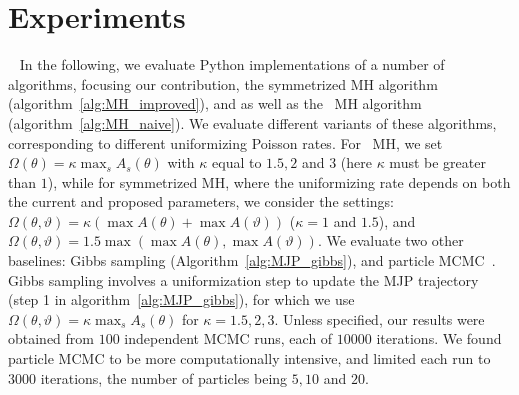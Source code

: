 \section{Experiments}\label{sec:expts}~
In the following, we evaluate Python implementations of a number of algorithms, focusing our contribution, the symmetrized MH algorithm (algorithm~\ref{alg:MH_improved}), and as well as the \naive\ MH algorithm (algorithm~\ref{alg:MH_naive}).
We evaluate different variants of these algorithms, corresponding to different uniformizing Poisson rates. %
For \naive\ MH, we set $\Omega(\theta) = \kappa \max_s A_s(\theta) $ with $\kappa$  equal to $1.5, 2$ and $3$ (here $\kappa$ must be greater than $1$), 
while for symmetrized MH, where the uniformizing rate depends on both the current and proposed parameters, we consider the settings:
 $\Omega(\theta, \vartheta) = \kappa (\max A(\theta) + \max A(\vartheta))$ 
 ($\kappa = 1$ and $1.5$), and 
$\Omega(\theta, \vartheta) = 1.5 \max(\max A(\theta), \max A(\vartheta))$.
We evaluate two other baselines: Gibbs sampling (Algorithm~\ref{alg:MJP_gibbs}), %
and particle MCMC~\citep[][see also section~\ref{sec:pmcmc} in the appendix]{Andrieu10}. 
Gibbs sampling involves a uniformization step to update the MJP trajectory (step 1 in algorithm~\ref{alg:MJP_gibbs}), for which we use $\Omega(\theta,\vartheta) = \kappa \max_s A_s(\theta)$ for $\kappa=1.5,2,3$. 
Unless specified, our results were obtained from $100$ independent MCMC runs, each of $10000$ iterations.
We found particle MCMC to be more computationally intensive, and limited each run to $3000$ iterations, the number of particles being $5, 10$ and $20$.%


